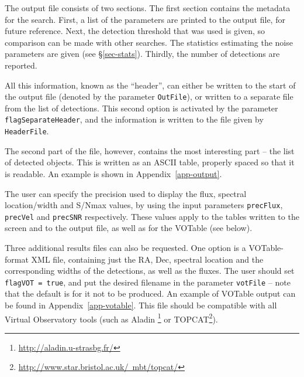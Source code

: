 The output file consists of two sections. The first section contains
the metadata for the search. First, a list of the parameters are
printed to the output file, for future reference. Next, the detection
threshold that was used is given, so comparison can be made with other
searches. The statistics estimating the noise parameters are given
(see \S\ref{sec-stats}). Thirdly, the number of detections are
reported.

All this information, known as the ``header'', can either be written
to the start of the output file (denoted by the parameter
\texttt{OutFile}), or written to a separate file from the list of
detections. This second option is activated by the parameter
\texttt{flagSeparateHeader}, and the information is written to the
file given by \texttt{HeaderFile}.

The second part of the file, however, contains the most interesting
part --  the list of detected objects. This is written as an ASCII
table, properly spaced so that it is readable. An example is shown in
Appendix~\ref{app-output}. 

The user can specify the precision used to display the flux, spectral
location/width and S/Nmax values, by using the input parameters
\texttt{precFlux}, \texttt{precVel} and \texttt{precSNR}
respectively. These values apply to the tables written to the screen
and to the output file, as well as for the VOTable (see below).


\label{sec-votable}

Three additional results files can also be requested. One option is a
VOTable-format XML file, containing just the RA, Dec, spectral
location and the corresponding widths of the detections, as well as
the fluxes. The user should set \texttt{flagVOT = true}, and put the
desired filename in the parameter \texttt{votFile} -- note that the
default is for it not to be produced. An example of VOTable output can
be found in Appendix~\ref{app-votable}.  This file should be
compatible with all Virtual Observatory tools (such as Aladin%
\footnote{%
  \href{http://aladin.u-strasbg.fr/}{http://aladin.u-strasbg.fr/}} or
TOPCAT\footnote{%
  \href{http://www.star.bristol.ac.uk/~mbt/topcat/}%
  {http://www.star.bristol.ac.uk/~mbt/topcat/}}).

\label{sec-annotfiles}

